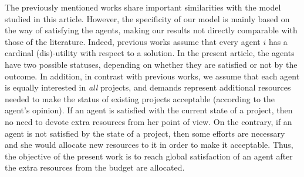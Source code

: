The previously mentioned works share important similarities with the model studied in this article. However, the specificity of our model is mainly based on the way of satisfying the agents, making our results not directly comparable with those of the literature. Indeed, previous works assume that every agent $i$ has a cardinal (dis)-utility with respect to a solution. In the present article, the agents have two possible statuses, depending on whether they are satisfied or not by the outcome. In addition, in contrast with previous works, we assume that each agent is equally interested in \emph{all} projects, and demands represent additional resources needed to make the status of existing projects acceptable (according to the agent's opinion). If an agent is satisfied with the current state of a project, then no need to devote extra resources from her point of view. On the contrary, if an agent is not satisfied by the state of a project, then some efforts are necessary and she would allocate new resources to it in order to make it acceptable. Thus, the objective of the present work is to reach global satisfaction of an agent after the extra resources from the budget are allocated.